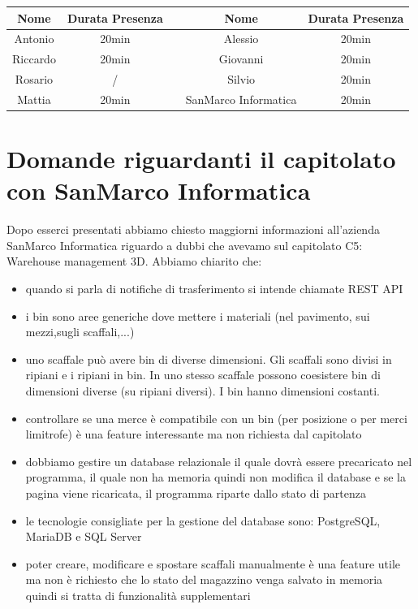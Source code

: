 \documentclass[12pt,a4paper]{article}
\begin{document}
\begin{center}
    \begin{tabular}{ |c|c|c|c|c| }
        \hline
        Nome     & Durata Presenza &  & Nome     & Durata Presenza \\
        \hline
        Antonio  & 20min          &  & Alessio  & 20min           \\
        \hline
        Riccardo & 20min           &  & Giovanni & 20min           \\
        \hline
        Rosario  & /           &  & Silvio   & 20min           \\
        \hline
        Mattia   & 20min           &  &SanMarco Informatica          & 20min                \\
        \hline

    \end{tabular}
\end{center}

\newpage



\section{Domande riguardanti il capitolato con SanMarco Informatica}
Dopo esserci presentati abbiamo chiesto maggiorni informazioni all'azienda SanMarco Informatica riguardo a dubbi che avevamo sul capitolato C5: Warehouse management 3D.
Abbiamo chiarito che:
\begin{itemize}
    \item quando si parla di notifiche di trasferimento si intende chiamate REST API
    \item i bin sono aree generiche dove mettere i materiali (nel pavimento, sui mezzi,sugli scaffali,...)
    \item uno scaffale può avere bin di diverse dimensioni. Gli scaffali sono divisi in ripiani e i ripiani in bin. In uno stesso scaffale possono coesistere bin di dimensioni diverse (su ripiani diversi).
    I bin hanno dimensioni costanti.
    \item controllare se una merce è compatibile con un bin (per posizione o per merci limitrofe) è una feature interessante ma non richiesta dal capitolato
    \item dobbiamo gestire un database relazionale il quale dovrà essere precaricato nel programma, il quale non ha memoria quindi non modifica il database e se la pagina viene ricaricata, il programma riparte dallo stato di partenza
    \item le tecnologie consigliate per la gestione del database sono: PostgreSQL, MariaDB e SQL Server
    \item poter creare, modificare e spostare scaffali manualmente è una feature utile ma non è richiesto che lo stato del magazzino venga salvato in memoria quindi si tratta di funzionalità supplementari
\end{itemize} 
\end{document}
